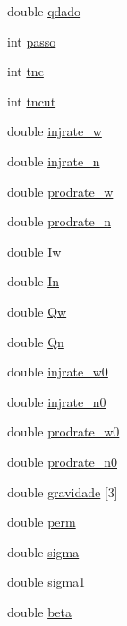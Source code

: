 \begin{DoxyCompactItemize}
double \hyperlink{classDG__Prob_a0070c89a21c00ffd82d84418b394308b}{qdado}
\item 
int \hyperlink{classDG__Prob_a496f504b7728fe91007014a47897132e}{passo}
\item 
int \hyperlink{classDG__Prob_a92c7fcafcecaceddd9be64275e32772c}{tnc}
\item 
int \hyperlink{classDG__Prob_a6f90c501c5168021ad92a7992a7c7999}{tncut}
\item 
double \hyperlink{classDG__Prob_a1208fdc3b8a7a1d926400cb818c00552}{injrate\+\_\+w}
\item 
double \hyperlink{classDG__Prob_a28e2522980d0880a464b0aaffb30ad83}{injrate\+\_\+n}
\item 
double \hyperlink{classDG__Prob_a96bd3f227a29c258f7ee0b61ab5e5f78}{prodrate\+\_\+w}
\item 
double \hyperlink{classDG__Prob_a77093932267aeaf6bb31c8b852dbecab}{prodrate\+\_\+n}
\item 
double \hyperlink{classDG__Prob_a35c69d2d0422f896101f61240efca64a}{Iw}
\item 
double \hyperlink{classDG__Prob_aebab98aa14e6b30bc3d8cda2f83b7feb}{In}
\item 
double \hyperlink{classDG__Prob_a23d1f5768b5c7f9336dfb99eef9c9a61}{Qw}
\item 
double \hyperlink{classDG__Prob_ab0aa6693ee2206486978b809517c982f}{Qn}
\item 
double \hyperlink{classDG__Prob_a8fc3d2c5122a16140acf1b769f11b471}{injrate\+\_\+w0}
\item 
double \hyperlink{classDG__Prob_adecea13d0f4c0c9e820a3fba55d292ed}{injrate\+\_\+n0}
\item 
double \hyperlink{classDG__Prob_acc3fd060620ad62da677c0b88a777235}{prodrate\+\_\+w0}
\item 
double \hyperlink{classDG__Prob_ab075a283993b498c0a9d224f33831ec2}{prodrate\+\_\+n0}
\item 
double \hyperlink{classDG__Prob_a50341df3061ede25eb1efbef00efb071}{gravidade} \mbox{[}3\mbox{]}
\item 
double \hyperlink{classDG__Prob_ad557b623b51a795a561c8062ee6d01f0}{perm}
\item 
double \hyperlink{classDG__Prob_a93197609da7dbef6707e58bdc32b8d12}{sigma}
\item 
double \hyperlink{classDG__Prob_aa75a7526410f7d21514bf500c01096cd}{sigma1}
\item 
double \hyperlink{classDG__Prob_a6ab4e3c1a81f2c882fab1fb689f5732a}{beta}
\item 

\end{DoxyCompactItemize}
